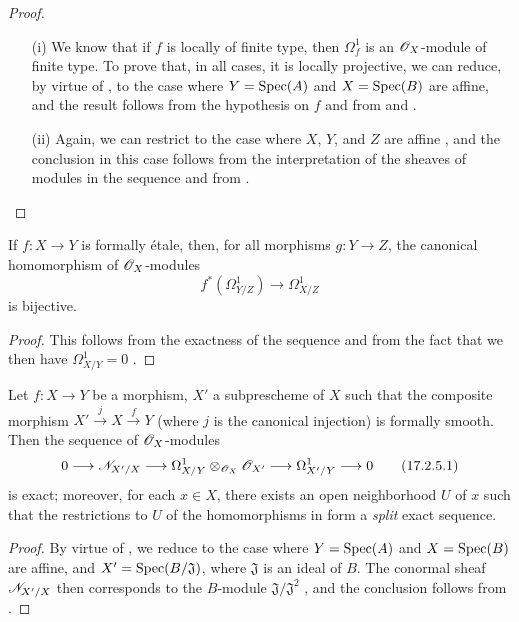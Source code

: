 \begin{proof}
\medskip\noindent
\begin{enumerate}
  \item[(i)] We know  that if $f$ is locally of finite type, then $\Omega_f^1$ is an $\mathscr{O}_X$-module of finite type. 
    To prove that, in all cases, it is locally projective, we can reduce, by virtue of , to the case where $Y=\operatorname{Spec}(A)$ and $X=\operatorname{Spec}(B)$ are affine, and the result follows from the hypothesis on $f$ and from  and .
  \item[(ii)] Again, we can restrict to the case where $X$, $Y$, and $Z$ are affine , and the conclusion in this case follows from the interpretation of the sheaves of modules in the sequence  and from .
\end{enumerate}
\end{proof}

\begin{corollary}[17.2.4]
\label{IV.17.2.4}
If $f:X\to Y$ is formally \'etale, then, for all morphisms $g:Y\to Z$, the canonical homomorphism of $\mathscr{O}_X$-modules
\[
  f^*(\Omega_{Y/Z}^1)\to\Omega_{X/Z}^1
\]
is bijective.
\end{corollary}

\begin{proof}
This follows from the exactness of the sequence  and from the fact that we then have $\Omega_{X/Y}^1=0$ .
\end{proof}

\begin{proposition}[17.2.5]
\label{IV.17.2.5}
Let $f:X\to Y$ be a morphism, $X'$ a subprescheme of $X$ such that the composite morphism $X'\xrightarrow{j}X\xrightarrow{f}Y$ (where $j$ is the canonical injection) is formally smooth.
Then the sequence of $\mathscr{O}_X$-modules 
\[
\label{IV.17.2.5.1}
  0\to\sh{N}_{X'/X}\to\Omega_{X/Y}^1\otimes_{\sh{O}_X}\sh{O}_{X'}\to\Omega_{X'/Y}^1\to 0
\tag{17.2.5.1}
\]
is exact; moreover, for each $x\in X$, there exists an open neighborhood $U$ of $x$ such that the restrictions to $U$ of the homomorphisms in  form a \emph{split} exact sequence.
\end{proposition}

\begin{proof}
By virtue of , we reduce to the case where $Y=\operatorname{Spec}(A)$ and $X=\operatorname{Spec}(B)$ are affine, and $X'=\operatorname{Spec}(B/\mathfrak{J})$, where $\mathfrak{J}$ is an ideal of $B$. 
The conormal sheaf $\mathscr{N}_{X'/X}$ then corresponds to the $B$-module $\mathfrak{J}/\mathfrak{J}^2$ , and the conclusion follows from .
\end{proof}


